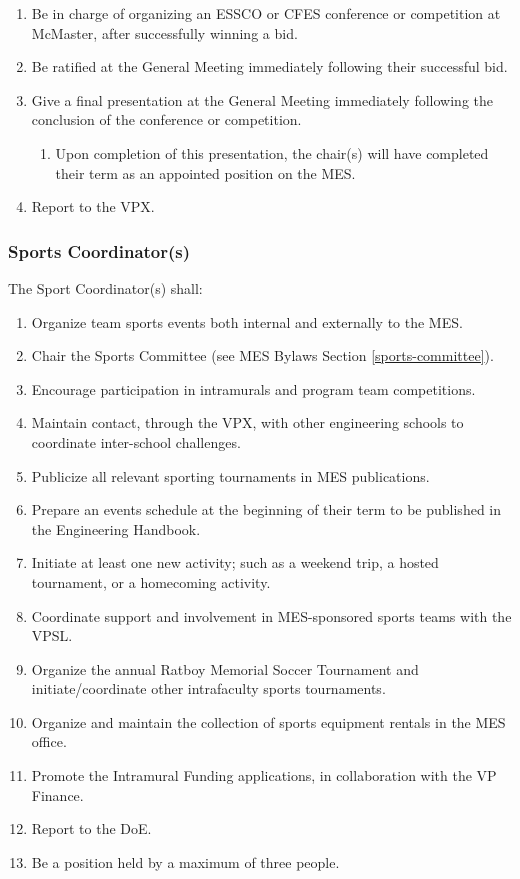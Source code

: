 \begin{enumerate}
 \item
  Be in charge of organizing an ESSCO or CFES conference or competition at McMaster, after successfully winning a bid.
 \item
  Be ratified at the General Meeting immediately following their successful bid.
 \item
  Give a final presentation at the General Meeting immediately following the conclusion of the conference or competition.

  \begin{enumerate}
   \item
    Upon completion of this presentation, the chair(s) will have completed their term as an appointed position on the MES.
  \end{enumerate}
 \item
  Report to the VPX.

\end{enumerate}

\subsubsection{Sports Coordinator(s)}
\label{sports-coordinators}
The Sport Coordinator(s) shall:

\begin{enumerate}
 \item
  Organize team sports events both internal and externally to the MES.
 \item
  Chair the Sports Committee (see MES Bylaws Section \ref{sports-committee}).
 \item
  Encourage participation in intramurals and program team competitions.
 \item
  Maintain contact, through the VPX, with other engineering schools to coordinate inter-school challenges.
 \item
  Publicize all relevant sporting tournaments in MES publications.
 \item
  Prepare an events schedule at the beginning of their term to be published in the Engineering Handbook.
 \item
  Initiate at least one new activity; such as a weekend trip, a hosted tournament, or a homecoming activity.
 \item
  Coordinate support and involvement in MES-sponsored sports teams with the VPSL.
 \item
  Organize the annual Ratboy Memorial Soccer Tournament and initiate/coordinate other intrafaculty sports tournaments.
 \item
  Organize and maintain the collection of sports equipment rentals in the MES office.
 \item
 Promote the Intramural Funding applications, in collaboration with the VP Finance.
 \item
  Report to the DoE.
 \item
  Be a position held by a maximum of three people.
\end{enumerate}


